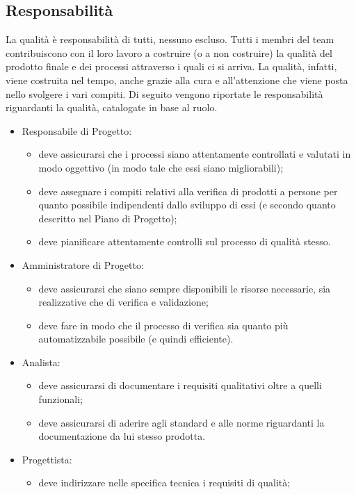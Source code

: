 		\subsection{Responsabilità}
			La qualità è responsabilità di tutti, nessuno escluso. Tutti i membri del team contribuiscono con il loro lavoro a costruire (o a non 
			costruire) la qualità del prodotto finale e dei processi attraverso i quali ci si arriva. La qualità, infatti, viene costruita nel tempo, 
			anche grazie alla cura e all'attenzione che viene posta nello svolgere i vari compiti.
			Di seguito vengono riportate le responsabilità riguardanti la qualità, catalogate in base al ruolo.
			\begin{itemize}
				\item Responsabile di Progetto:
				\begin{itemize}
					\item deve assicurarsi che i processi siano attentamente controllati e valutati in modo oggettivo (in modo tale che essi siano 
					migliorabili);
					\item deve assegnare i compiti relativi alla verifica di prodotti a persone per quanto possibile indipendenti dallo sviluppo di essi 
					(e secondo quanto descritto nel Piano di Progetto);
					\item deve pianificare attentamente controlli sul processo di qualità stesso.
				\end{itemize}
				\item Amministratore di Progetto:
				\begin{itemize}
					\item deve assicurarsi che siano sempre disponibili le risorse necessarie, sia realizzative che di verifica e validazione;
					\item deve fare in modo che il processo di verifica sia quanto più automatizzabile possibile (e quindi efficiente).
				\end{itemize}
				\item Analista:
				\begin{itemize}
					\item deve assicurarsi di documentare i requisiti qualitativi oltre a quelli funzionali;
					\item deve assicurarsi di aderire agli standard e alle norme riguardanti la documentazione da lui stesso prodotta.
				\end{itemize}
				\item Progettista:
				\begin{itemize}
					\item deve indirizzare nelle specifica tecnica i requisiti di qualità;

\end{itemize}
\end{itemize}
